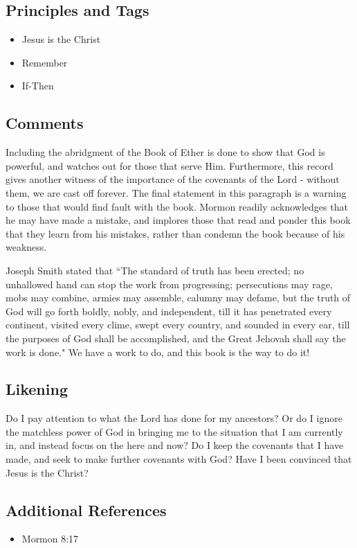 \documentclass[12pt]{report}
\begin{document}
\subsection{Principles and Tags\label{titlePage:principles3}}
\begin{itemize}
\item {}Jesus is the Christ
\item {}Remember
\item {}If-Then
\end{itemize}

\subsection{Comments\label{titlePage:comments3}}
Including the abridgment of the Book of Ether is done to show that God is powerful, and watches out for those that serve Him.  Furthermore, this record gives another witness of the importance of the covenants of the Lord - without them, we are cast off forever.  The final statement in this paragraph is a warning to those that would find fault with the book.  Mormon readily acknowledges that he may have made a mistake, and implores those that read and ponder this book that they learn from his mistakes, rather than condemn the book because of his weakness.

Joseph Smith stated that ``The standard of truth has been erected; no unhallowed hand can stop the work from progressing; persecutions may rage, mobs may combine, armies may assemble, calumny may defame, but the truth of God will go forth boldly, nobly, and independent, till it has penetrated every continent, visited every clime, swept every country, and sounded in every ear, till the purposes of God shall be accomplished, and the Great Jehovah shall say the work is done."  We have a work to do, and this book is the way to do it!

\subsection{Likening\label{titlePage:likening3}}
Do I pay attention to what the Lord has done for my ancestors?  Or do I ignore the matchless power of God in bringing me to the situation that I am currently in, and instead focus on the here and now?  Do I keep the covenants that I have made, and seek to make further covenants with God?  Have I been convinced that Jesus is the Christ?

\subsection{Additional References\label{titlePage:references3}}
\begin{itemize}
\item Mormon 8:17
\end{itemize}
\end{document}
